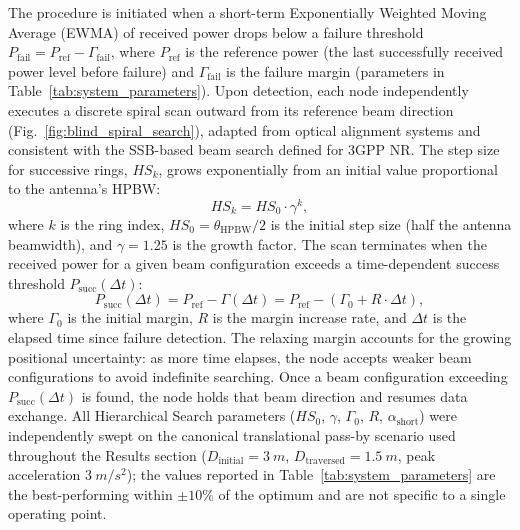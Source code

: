 \documentclass[fleqn,10pt]{wlscirep}
\newcommand{\rev}[1]{{\color{revblue}#1}}
\begin{document}
The procedure is initiated when a short-term Exponentially Weighted Moving Average (EWMA) of received power drops below a failure threshold $P_{\text{fail}} = P_{\text{ref}} - \Gamma_{\text{fail}}$, where $P_{\text{ref}}$ is the reference power (the last successfully received power level before failure) and $\Gamma_{\text{fail}}$ is the failure margin (parameters in Table~\ref{tab:system_parameters}). Upon detection, each node independently executes a discrete spiral scan outward from its reference beam direction (Fig.~\ref{fig:blind_spiral_search}), adapted from optical alignment systems\cite{photonics11060540} \rev{and consistent with the SSB-based beam search defined for 3GPP NR\cite{Giordani2018ATO, Heng2021SixChallenges}}. The step size for successive rings, $HS_k$, grows exponentially from an initial value proportional to the antenna's HPBW:
\begin{equation}
    HS_k = HS_0 \cdot \gamma^k,
\end{equation}
where $k$ is the ring index, $HS_0 = \theta_{\text{HPBW}}/2$ is the initial step size (half the antenna beamwidth), and $\gamma = 1.25$ is the growth factor. The scan terminates when the received power for a given beam configuration exceeds a time-dependent success threshold $P_{\text{succ}}(\Delta t)$:
\begin{equation}
    P_{\text{succ}}(\Delta t) = P_{\text{ref}} - \Gamma(\Delta t) = P_{\text{ref}} - (\Gamma_{0} + R \cdot \Delta t),
\end{equation}
where $\Gamma_{0}$ is the initial margin, $R$ is the margin increase rate, and $\Delta t$ is the elapsed time since failure detection. The relaxing margin accounts for the growing positional uncertainty: as more time elapses, the node accepts weaker beam configurations to avoid indefinite searching. Once a beam configuration exceeding $P_{\text{succ}}(\Delta t)$ is found, the node holds that beam direction and resumes data exchange. \rev{All Hierarchical Search parameters ($HS_0$, $\gamma$, $\Gamma_0$, $R$, $\alpha_{\text{short}}$) were independently swept on the canonical translational pass-by scenario used throughout the Results section ($D_{\text{initial}} = \SI{3}{m}$, $D_{\text{traversed}} = \SI{1.5}{m}$, peak acceleration $\SI{3}{m/s^2}$); the values reported in Table~\ref{tab:system_parameters} are the best-performing within $\pm 10\%$ of the optimum and are not specific to a single operating point.}
\end{document}
